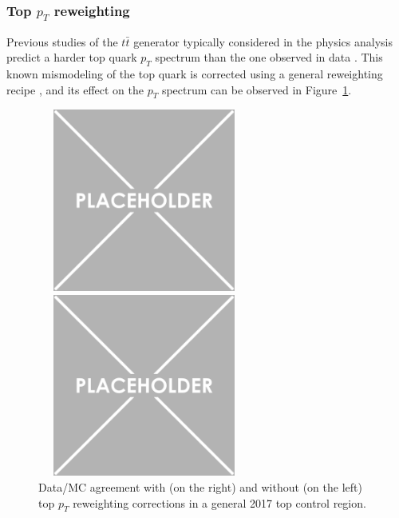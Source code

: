 \documentclass[a4paper, 10pt, openright]{report}
\begin{document}
\subsubsection{Top $p_T$ reweighting}

Previous studies of the $t \bar t$ generator typically considered in the physics analysis predict a harder top quark $p_T$ spectrum than the one observed in data \cite{topPt}. This known mismodeling of the top quark is corrected using a general reweighting recipe \cite{TopPtRecipe}, and its effect on the $p_T$ spectrum can be observed in Figure~\ref{fig:Toppt}.

\begin{figure}[htbp]
\begin{center}
\begin{minipage}[b]{.48\textwidth}
\includegraphics[width=7cm, height=6cm]{figs/placeholder.png}
\end{minipage} \hfill
\begin{minipage}[b]{.48\textwidth}
\includegraphics[width=7cm, height=6cm]{figs/placeholder.png}
\end{minipage} \hfill
\caption{Data/\ac{MC} agreement with (on the right) and without (on the left) top $p_T$ reweighting corrections in a general 2017 top control region.}
\label{fig:Toppt}
\end{center}
\end{figure}
\end{document}
